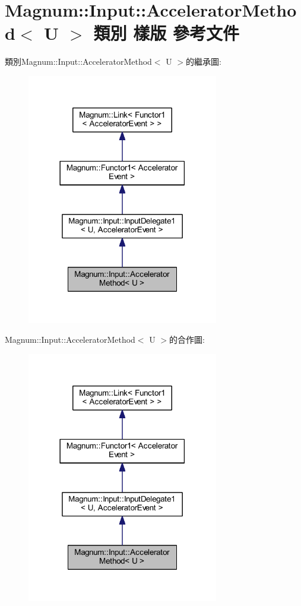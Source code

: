\hypertarget{class_magnum_1_1_input_1_1_accelerator_method}{}\section{Magnum\+:\+:Input\+:\+:Accelerator\+Method$<$ U $>$ 類別 樣版 參考文件}
\label{class_magnum_1_1_input_1_1_accelerator_method}


類別\+Magnum\+:\+:Input\+:\+:Accelerator\+Method$<$ U $>$的繼承圖\+:\nopagebreak
\begin{figure}[H]
\begin{center}
\leavevmode
\includegraphics[width=237pt]{class_magnum_1_1_input_1_1_accelerator_method__inherit__graph}
\end{center}
\end{figure}


Magnum\+:\+:Input\+:\+:Accelerator\+Method$<$ U $>$的合作圖\+:\nopagebreak
\begin{figure}[H]
\begin{center}
\leavevmode
\includegraphics[width=237pt]{class_magnum_1_1_input_1_1_accelerator_method__coll__graph}
\end{center}
\end{figure}
